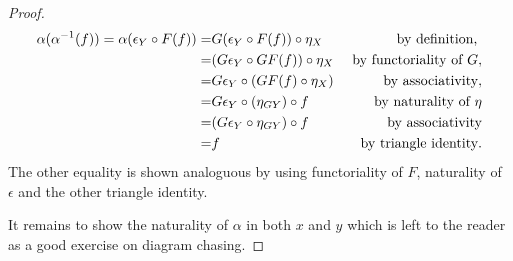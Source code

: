 \begin{thm}
\begin{proof}
\begin{eqnarray*}
\alpha(\alpha^{-1}(f)) = \alpha(\co{F(f)}{\epsilon_Y}) =& \co{\eta_X}{G(\co{F(f)}{\epsilon_Y})} &\text{ by definition, }\\
	=& \co{\eta_X}{(\co{GF(f)}{G\epsilon_Y})} &\text{ by functoriality of $G$},\\
	=& \co{(\co{\eta_X}{GF(f)})}{G\epsilon_Y} &\text{ by associativity},\\
	=& \co{(\co{f}{\eta_{GY})}}{G\epsilon_Y} &\text{ by naturality of $\eta$}\\
	=& \co{f}{(\co{\eta_{GY}}{G\epsilon_Y})} &\text{ by associativity}\\
	=& f &\text{by triangle identity}.
\end{eqnarray*}
The other equality is shown analoguous by using functoriality of $F$, naturality of $\epsilon$ and the other triangle identity.

It remains to show the naturality of $\alpha$ in both $x$ and $y$ which is left to the reader as a good exercise on diagram chasing. %
\end{proof}
\end{thm}
